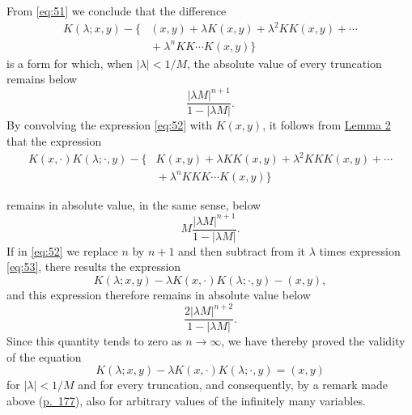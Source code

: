 \documentclass[b5paper,twoside]{article}
\newcommand{\originalpage}[1]{\phantomsection\label{origpage:#1}}
\begin{document}
From \eqref{eq:51} we conclude that the difference
\begin{equation}
\tag{52}\label{eq:52}
\begin{aligned}
  K(\lambda;x,y)-\bigl\{&(x,y)+\lambda K(x,y)+\lambda^2KK(x,y)+\cdots\\
  &{}+\lambda^nKK\cdots K(x,y)\bigr\}
\end{aligned}
\end{equation}
is a form for which, when $\lvert\lambda\rvert<1/M$, the absolute value of
every truncation remains below
\[
  \frac{\lvert\lambda M\rvert^{n+1}}{1-\lvert\lambda M\rvert}.
\]
By convolving the expression \eqref{eq:52} with $K(x,y)$, it follows from
\hyperref[lem:2]{Lemma 2} that the expression
\begin{equation}
\tag{53}\label{eq:53}
\begin{aligned}
  K(x,\mathord{\cdot})K(\lambda;\mathord{\cdot},y)
  -\bigl\{&K(x,y)+\lambda KK(x,y)+\lambda^2KKK(x,y)+\cdots\\
           &{}+\lambda^nKKK\cdots K(x,y)\bigr\}
\end{aligned}
\end{equation}

\originalpage{186}
remains in absolute value, in the same sense, below
\[
  M\frac{\lvert\lambda M\rvert^{n+1}}
          {1-\lvert\lambda M\rvert}.
\]
If in \eqref{eq:52} we replace $n$ by $n+1$ and then subtract from it
$\lambda$ times expression \eqref{eq:53}, there results the expression
\[
  K(\lambda;x,y)
  -\lambda K(x,\mathord{\cdot})K(\lambda;\mathord{\cdot},y)-(x,y),
\]
and this expression therefore remains in absolute value below
\[
  \frac{2\lvert\lambda M\rvert^{n+2}}
       {1-\lvert\lambda M\rvert}.
\]
Since this quantity tends to zero as $n\to\infty$, we have thereby proved
the validity of the equation
\begin{equation}
\tag{54}\label{eq:54}
  K(\lambda;x,y)
  -\lambda K(x,\mathord{\cdot})K(\lambda;\mathord{\cdot},y)
  =(x,y)
\end{equation}
for $\lvert\lambda\rvert<1/M$ and for every truncation, and consequently,
by a remark made above (\hyperref[origpage:177]{p.~177}), also for arbitrary
values of the infinitely many variables.
\end{document}
